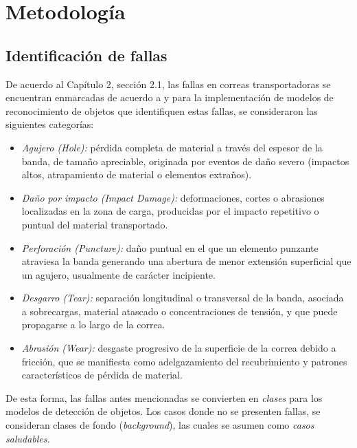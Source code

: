 \chapter{Metodología}

\section{Identificación de fallas}

De acuerdo al Capítulo 2, sección 2.1, las fallas en correas transportadoras se encuentran enmarcadas de acuerdo a \cite{khanna2022types} y para la implementación de modelos de reconocimiento de objetos que identifiquen estas fallas, se consideraron las siguientes categorías:

\begin{itemize}
    \item \textit{Agujero (Hole):} pérdida completa de material a través del espesor de la banda, de tamaño apreciable, originada por eventos de daño severo (impactos altos, atrapamiento de material o elementos extraños).
    \item \textit{Daño por impacto (Impact Damage):} deformaciones, cortes o abrasiones localizadas en la zona de carga, producidas por el impacto repetitivo o puntual del material transportado.
    \item \textit{Perforación (Puncture):} daño puntual en el que un elemento punzante atraviesa la banda generando una abertura de menor extensión superficial que un agujero, usualmente de carácter incipiente.
    \item \textit{Desgarro (Tear):} separación longitudinal o transversal de la banda, asociada a sobrecargas, material atascado o concentraciones de tensión, y que puede propagarse a lo largo de la correa.
    \item \textit{Abrasión (Wear):} desgaste progresivo de la superficie de la correa debido a fricción, que se manifiesta como adelgazamiento del recubrimiento y patrones característicos de pérdida de material.
\end{itemize}

De esta forma, las fallas antes mencionadas se convierten en \textit{clases} para los modelos de detección de objetos. Los casos donde no se presenten fallas, se consideran clases de fondo (\textit{background}), las cuales se asumen como \textit{casos saludables.} \\

\newpage
